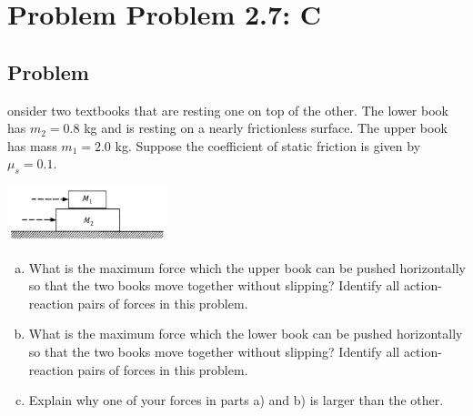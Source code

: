 \documentclass[solutions]{esg8012pset}
\begin{document}
\section*{Problem Problem 2.7: C}
\subsection*{Problem}
onsider two textbooks that are resting one on top of the other. The lower book has $m_2 = 0.8$ kg and is resting on a nearly frictionless surface. The upper book has mass $m_1 = 2.0$ kg. Suppose the coefficient of static friction is given by $\mu_s = 0.1$.
  \begin{center}\includegraphics[width=0.35\textwidth]{ps02_2}\end{center}
  \begin{enumerate}[a)]
    \item What is the maximum force which the upper book can be pushed horizontally so that the two books move together without slipping? Identify all action-reaction pairs of forces in this problem.
    \item What is the maximum force which the lower book can be pushed horizontally so that the two books move together without slipping? Identify all action-reaction pairs of forces in this problem.
    \item Explain why one of your forces in parts a) and b) is larger than the other.
  \end{enumerate}
\end{document}
